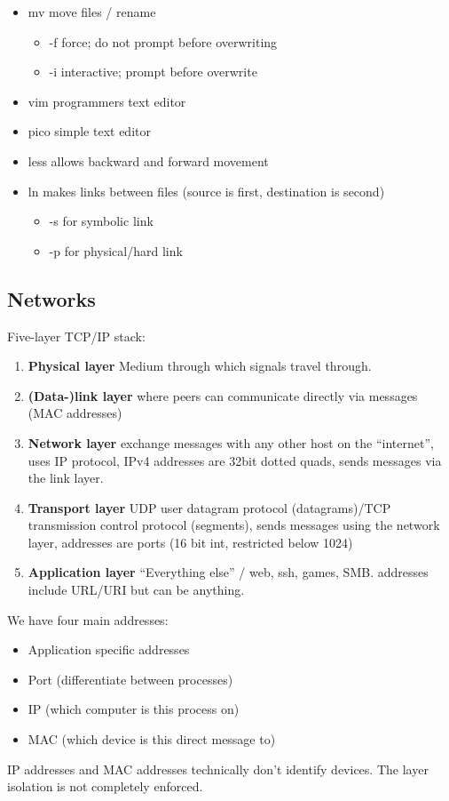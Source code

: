 \documentclass[10pt, a4paper]{article}
\begin{document}
\begin{multicols}{4}
\begin{itemize}
\begin{itemize}
        \end{itemize}
        \item mv  move files / rename
        \begin{itemize}
            \item -f force; do not prompt before overwriting
            \item -i interactive; prompt before overwrite
        \end{itemize}
        \item vim  programmers text editor
        \item pico  simple text editor
        \item less  allows backward and forward movement
        \item ln  makes links between files (source is first, destination is second) 
        \begin{itemize}
            \item -s for symbolic link
            \item -p for physical/hard link
        \end{itemize}
    \end{itemize}
    
    \subsection*{Networks}
    Five-layer TCP/IP stack:
    \begin{enumerate}
        \item \textbf{Physical layer}
            Medium through which signals travel through.
        \item \textbf{(Data-)link layer} where peers can communicate directly via messages (MAC addresses)
        \item \textbf{Network layer} exchange messages with any other host on the ``internet'', uses IP protocol, IPv4 addresses are 32bit dotted quads, sends messages via the link layer.
        \item \textbf{Transport layer} UDP user datagram protocol (datagrams)/TCP transmission control protocol (segments), sends messages using the network layer, addresses are ports (16 bit int, restricted below 1024)
        \item \textbf{Application layer} ``Everything else'' / web, ssh, games, SMB. addresses include URL/URI but can be anything.
    \end{enumerate}
    We have four main addresses:
    \begin{itemize}
        \item Application specific addresses
        \item Port (differentiate between processes)
        \item IP (which computer is this process on)
        \item MAC (which device is this direct message to)
    \end{itemize}
    IP addresses and MAC addresses technically don't identify devices. The layer isolation is not completely enforced.


\end{multicols}
\end{document}
